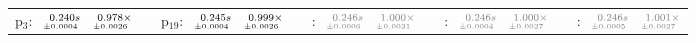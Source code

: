 \documentclass[a4paper,UKenglish]{lipics-v2016}
\begin{document}
\begin{table*}
\begin{adjustbox}{width=1.2\textwidth,center}
\begin{tabular}{rrrp{.1em}rrrp{.1em}rrrp{.1em}rrrp{.1em}rrr}
{\tiny p$_{3}$:}&$\substack{\mathmakebox[.7cm][r]{0.240}s\\{\mathmakebox[.7cm][r]{\scriptscriptstyle \pm 0.0004}}}$&$\substack{\mathmakebox[.7cm][r]{0.978}\times\\{\mathmakebox[.7cm][r]{\scriptscriptstyle \pm 0.0026}}}$&&{\tiny p$_{19}$:}&$\substack{\mathmakebox[.7cm][r]{0.245}s\\{\mathmakebox[.7cm][r]{\scriptscriptstyle \pm 0.0004}}}$&$\substack{\mathmakebox[.7cm][r]{0.999}\times\\{\mathmakebox[.7cm][r]{\scriptscriptstyle \pm 0.0026}}}$&&{\tiny \color{gray}{p$_{35}$}:}&$\substack{\mathmakebox[.7cm][r]{\color{gray}{0.246}}\color{gray}{s}\\{\mathmakebox[.7cm][r]{\scriptscriptstyle \color{gray}{\pm 0.0006}}}}$&$\substack{\mathmakebox[.7cm][r]{\color{gray}{1.000}}\color{gray}{\times}\\{\mathmakebox[.7cm][r]{\scriptscriptstyle \color{gray}{\pm 0.0031}}}}$&&{\tiny \color{gray}{p$_{51}$}:}&$\substack{\mathmakebox[.7cm][r]{\color{gray}{0.246}}\color{gray}{s}\\{\mathmakebox[.7cm][r]{\scriptscriptstyle \color{gray}{\pm 0.0004}}}}$&$\substack{\mathmakebox[.7cm][r]{\color{gray}{1.000}}\color{gray}{\times}\\{\mathmakebox[.7cm][r]{\scriptscriptstyle \color{gray}{\pm 0.0027}}}}$&&{\tiny \color{gray}{p$_{67}$}:}&$\substack{\mathmakebox[.7cm][r]{\color{gray}{0.246}}\color{gray}{s}\\{\mathmakebox[.7cm][r]{\scriptscriptstyle \color{gray}{\pm 0.0005}}}}$&$\substack{\mathmakebox[.7cm][r]{\color{gray}{1.001}}\color{gray}{\times}\\{\mathmakebox[.7cm][r]{\scriptscriptstyle \color{gray}{\pm 0.0027}}}}$\\

\end{tabular}
\end{adjustbox}
\end{table*}
\end{document}

